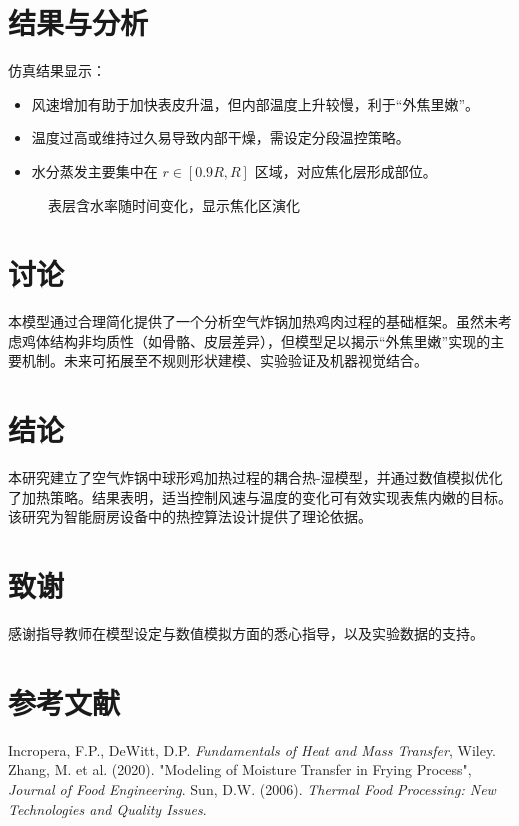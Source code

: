 \documentclass[12pt]{article}
\begin{document}
\section{结果与分析}
仿真结果显示：
\begin{itemize}
\item 风速增加有助于加快表皮升温，但内部温度上升较慢，利于“外焦里嫩”。
\item 温度过高或维持过久易导致内部干燥，需设定分段温控策略。
\item 水分蒸发主要集中在 $r \in [0.9R, R]$ 区域，对应焦化层形成部位。
\end{itemize}

\begin{figure}[htbp]
\centering
\caption{表层含水率随时间变化，显示焦化区演化}
\end{figure}

\section{讨论}
本模型通过合理简化提供了一个分析空气炸锅加热鸡肉过程的基础框架。虽然未考虑鸡体结构非均质性（如骨骼、皮层差异），但模型足以揭示“外焦里嫩”实现的主要机制。未来可拓展至不规则形状建模、实验验证及机器视觉结合。

\section{结论}
本研究建立了空气炸锅中球形鸡加热过程的耦合热-湿模型，并通过数值模拟优化了加热策略。结果表明，适当控制风速与温度的变化可有效实现表焦内嫩的目标。该研究为智能厨房设备中的热控算法设计提供了理论依据。

\section*{致谢}
感谢指导教师在模型设定与数值模拟方面的悉心指导，以及实验数据的支持。

\section*{参考文献}
\begin{thebibliography}{99}
 Incropera, F.P., DeWitt, D.P. \emph{Fundamentals of Heat and Mass Transfer}, Wiley.
 Zhang, M. et al. (2020). "Modeling of Moisture Transfer in Frying Process", \emph{Journal of Food Engineering}.
 Sun, D.W. (2006). \emph{Thermal Food Processing: New Technologies and Quality Issues}.
\end{thebibliography}
\end{document}
